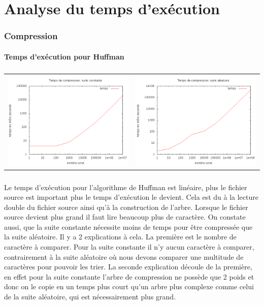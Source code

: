 \documentclass{report}
\begin{document}
\section*{Analyse du temps d’exécution}

\subsubsection*{Compression}
\paragraph*{}
\textbf{Temps d’exécution pour Huffman}
\subparagraph*{}
\hspace{-2cm}\begin{tabular}{l | l}
\includegraphics[width=7cm]{tempsChC.png} & 
\includegraphics[width=7cm]{tempsChA.png}
\end{tabular}

\subparagraph*{}
Le temps d'exécution pour l'algorithme de Huffman est linéaire, plus le fichier source est important plus le temps d'exécution le devient. Cela est du à la lecture double du fichier source ainsi qu'à la construction de l'arbre. Lorsque le fichier source devient plus grand il faut lire beaucoup plus de caractère.    
On constate aussi, que la suite constante nécessite moins de temps pour être compressée que la suite aléatoire. Il y a 2 explications à cela. La première est le nombre de caractère à comparer. Pour la suite constante il n'y aucun caractère à comparer, contrairement à la suite aléatoire où nous devons comparer une multitude de caractères pour pouvoir les trier. La seconde explication découle de la première, en effet pour la suite constante l'arbre de compression ne possède que 2 poids et donc on le copie en un temps plus court qu'un arbre plus complexe comme celui de la suite aléatoire, qui est nécessairement plus grand.  
\end{document}
